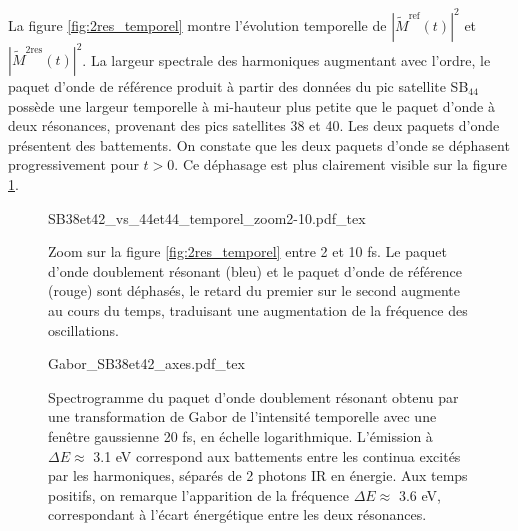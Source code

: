 La figure \ref{fig:2res_temporel} montre l'évolution temporelle de $|\tilde{M}^{\text{ref}}(t)|^2$ et $|\tilde{M}^{2 \text{res}}(t)|^2$. La largeur spectrale des harmoniques augmentant avec l'ordre, le paquet d'onde de référence produit à partir des données du pic satellite SB$_{44}$ possède une largeur temporelle à mi-hauteur plus petite que le paquet d'onde à deux résonances, provenant des pics satellites 38 et 40. Les deux paquets d'onde présentent des battements. On constate que les deux paquets d'onde se déphasent progressivement pour $t > 0$. Ce déphasage est plus clairement visible sur la figure \ref{fig:2res_temporel_zoom}.

\begin{figure}
\centering
\def\svgwidth{\textwidth}
{SB38et42_vs_44et44_temporel_zoom2-10.pdf_tex}
\caption{Zoom sur la figure \ref{fig:2res_temporel} entre 2 et 10 fs. Le paquet d'onde doublement résonant (bleu) et le paquet d'onde de référence (rouge) sont déphasés, le retard du premier sur le second augmente au cours du temps, traduisant une augmentation de la fréquence des oscillations.}
\label{fig:2res_temporel_zoom}
\end{figure}

\begin{figure}
\centering
\def\svgwidth{0.7\textwidth}
{Gabor_SB38et42_axes.pdf_tex}
\caption{Spectrogramme du paquet d'onde doublement résonant obtenu par une transformation de Gabor de l'intensité temporelle avec une fenêtre gaussienne 20 fs, en échelle logarithmique. L'émission à $\Delta E \approx $ 3.1 eV correspond aux battements entre les continua excités par les harmoniques, séparés de 2 photons IR en énergie. Aux temps positifs, on remarque l'apparition de la fréquence $\Delta E \approx$ 3.6 eV, correspondant à l'écart énergétique entre les deux résonances.}
\label{fig:2res_temporel_Gabor}
\end{figure}

